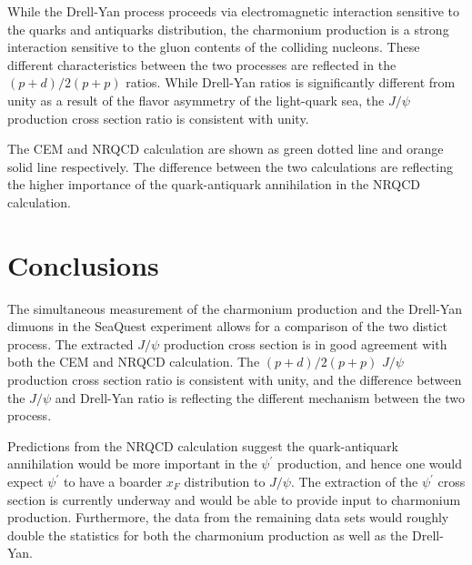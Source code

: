 \documentclass[10pt, a4paper,final]{article}
\begin{document}
While the Drell-Yan process proceeds via electromagnetic interaction sensitive
to the quarks and antiquarks distribution, the charmonium production is a strong
interaction sensitive to the gluon contents of the colliding nucleons. These
different characteristics between the two processes are reflected in the
$(p+d)/2(p+p)$ ratios. While Drell-Yan ratios is significantly different from unity
as a result of the flavor asymmetry of the light-quark sea, the $J/\psi$ production
cross section ratio is consistent with unity.

The CEM and NRQCD calculation are shown as green dotted line and orange solid line
respectively. The difference between the two calculations are reflecting the higher
importance of the quark-antiquark annihilation in the NRQCD calculation.

\section{Conclusions}
The simultaneous measurement of the charmonium production and the Drell-Yan dimuons
in the SeaQuest experiment allows for a comparison of the two distict process. The
extracted $J/\psi$ production cross section is in good agreement with both the CEM
and NRQCD calculation. The $(p+d)/2(p+p)$ $J/\psi$ production cross section ratio
is consistent with unity, and the difference between the $J/\psi$ and Drell-Yan
ratio is reflecting the different mechanism between the two process.

Predictions from the NRQCD calculation suggest the quark-antiquark annihilation would
be more important in the $\psi^\prime$ production, and hence one would expect $\psi^\prime$
to have a boarder $x_F$ distribution to $J/\psi$. The extraction of the $\psi^\prime$
cross section is currently underway and would be able to provide input to charmonium
production. Furthermore, the data from the remaining data sets would roughly double
the statistics for both the charmonium production as well as the Drell-Yan.

\printbibliography[heading=bibintoc,title={References}]
\listoftodos
\end{document}
